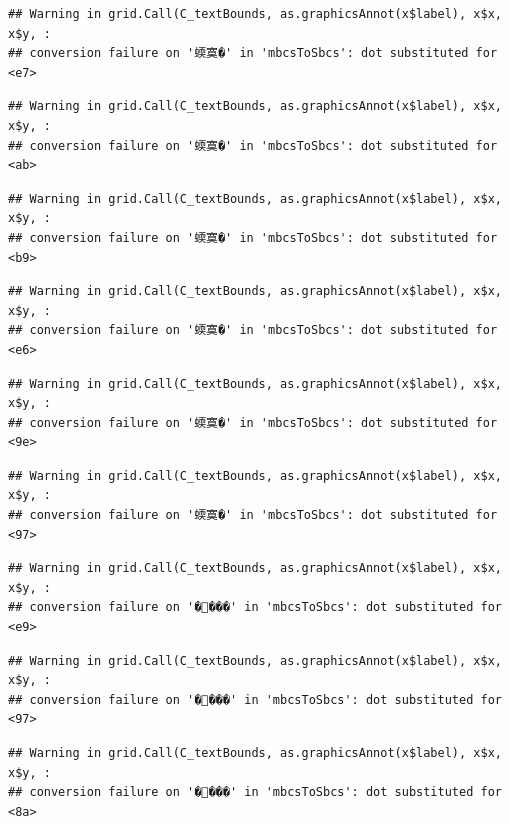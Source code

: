 \documentclass[
]{article}
\begin{document}
\begin{verbatim}
## Warning in grid.Call(C_textBounds, as.graphicsAnnot(x$label), x$x, x$y, :
## conversion failure on '蝡寞�' in 'mbcsToSbcs': dot substituted for <e7>
\end{verbatim}

\begin{verbatim}
## Warning in grid.Call(C_textBounds, as.graphicsAnnot(x$label), x$x, x$y, :
## conversion failure on '蝡寞�' in 'mbcsToSbcs': dot substituted for <ab>
\end{verbatim}

\begin{verbatim}
## Warning in grid.Call(C_textBounds, as.graphicsAnnot(x$label), x$x, x$y, :
## conversion failure on '蝡寞�' in 'mbcsToSbcs': dot substituted for <b9>
\end{verbatim}

\begin{verbatim}
## Warning in grid.Call(C_textBounds, as.graphicsAnnot(x$label), x$x, x$y, :
## conversion failure on '蝡寞�' in 'mbcsToSbcs': dot substituted for <e6>
\end{verbatim}

\begin{verbatim}
## Warning in grid.Call(C_textBounds, as.graphicsAnnot(x$label), x$x, x$y, :
## conversion failure on '蝡寞�' in 'mbcsToSbcs': dot substituted for <9e>
\end{verbatim}

\begin{verbatim}
## Warning in grid.Call(C_textBounds, as.graphicsAnnot(x$label), x$x, x$y, :
## conversion failure on '蝡寞�' in 'mbcsToSbcs': dot substituted for <97>
\end{verbatim}

\begin{verbatim}
## Warning in grid.Call(C_textBounds, as.graphicsAnnot(x$label), x$x, x$y, :
## conversion failure on '����' in 'mbcsToSbcs': dot substituted for <e9>
\end{verbatim}

\begin{verbatim}
## Warning in grid.Call(C_textBounds, as.graphicsAnnot(x$label), x$x, x$y, :
## conversion failure on '����' in 'mbcsToSbcs': dot substituted for <97>
\end{verbatim}

\begin{verbatim}
## Warning in grid.Call(C_textBounds, as.graphicsAnnot(x$label), x$x, x$y, :
## conversion failure on '����' in 'mbcsToSbcs': dot substituted for <8a>
\end{verbatim}
\end{document}
